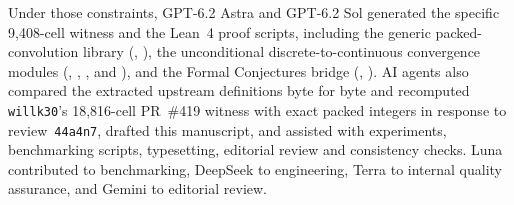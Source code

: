 \documentclass[sigplan,10pt,anonymous,review,balance=false]{acmart}
\begin{document}
Under those constraints, GPT-6.2 Astra and GPT-6.2 Sol generated
the specific 9,408-cell witness and the Lean~4 proof scripts, including
the generic packed-convolution library (,
), the unconditional discrete-to-continuous
convergence modules (, ,
,  and ), and
the Formal Conjectures bridge (,
).
AI agents also compared the extracted upstream definitions byte for byte
and recomputed \texttt{willk30}'s 18,816-cell PR~\#419 witness with exact
packed integers in response to review~\texttt{44a4n7}, drafted this
manuscript, and assisted with experiments, benchmarking scripts,
typesetting, editorial review and consistency checks. Luna
contributed to benchmarking, DeepSeek to engineering, Terra to internal
quality assurance, and Gemini to editorial review.



\end{document}
